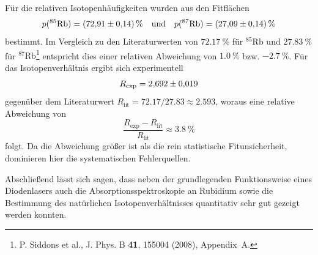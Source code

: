 Für die relativen Isotopenhäufigkeiten wurden aus den Fitflächen
\[
    p(^{85}\text{Rb}) = \SI{72.91 \pm 0.14}{\percent} \quad \text{und} \quad p(^{87}\text{Rb}) = \SI{27.09 \pm 0.14}{\percent}
\]
bestimmt. Im Vergleich zu den Literaturwerten von $\SI{72.17}{\percent}$ für $^{85}\text{Rb}$ und $\SI{27.83}{\percent}$ für $^{87}\text{Rb}$\footnote{P. Siddons et al., J. Phys. B \textbf{41}, 155004 (2008), Appendix~A.} entspricht dies einer relativen Abweichung von $\SI{+1.0}{\percent}$ bzw. $\SI{-2.7}{\percent}$. Für das Isotopenverhältnis ergibt sich experimentell
\[
    R_{\text{exp}} = \num{2.692 \pm 0.019}
\]
gegenüber dem Literaturwert $R_{\text{lit}} = \num{72.17} / \num{27.83} \approx \num{2.593}$, woraus eine relative Abweichung von
\[
    \frac{R_{\text{exp}} - R_{\text{lit}}}{R_{\text{lit}}} \approx \SI{3.8}{\percent}
\]
folgt. Da die Abweichung größer ist als die rein statistische Fitunsicherheit, dominieren hier die systematischen Fehlerquellen.

Abschließend lässt sich sagen, dass neben der grundlegenden Funktionsweise eines Diodenlasers auch die Absorptionsspektroskopie an Rubidium sowie die Bestimmung des natürlichen Isotopenverhältnisses quantitativ sehr gut gezeigt werden konnten. 


\newpage

